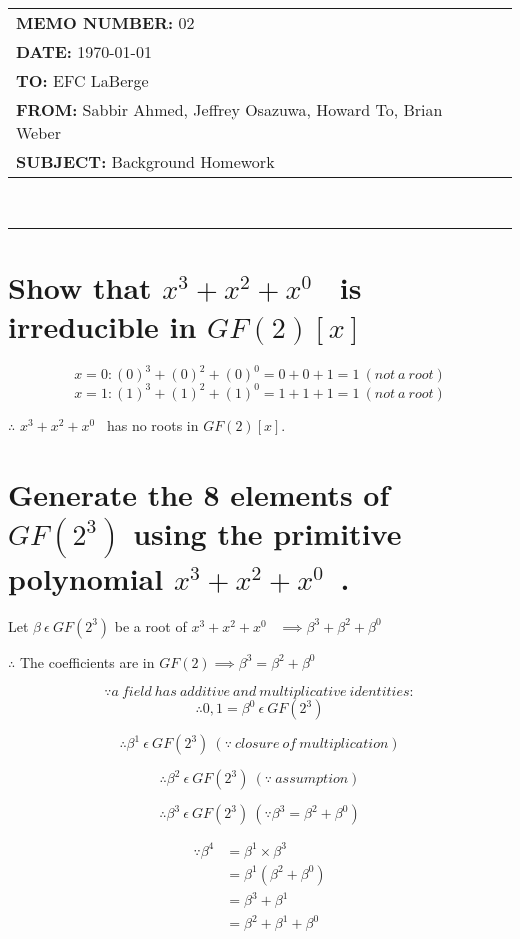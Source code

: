 \documentclass[paper=usletter, fontsize=12pt]{article}
\newcommand{\Sabbir}{Sabbir Ahmed}
\newcommand{\Jeffrey}{Jeffrey Osazuwa}
\newcommand{\Howard}{Howard To}
\newcommand{\Brian}{Brian Weber}
\newcommand{\polynomial}{$x^{3}+x^{2}+x^{0}$}
\newcommand{\documentinfo}[5]{
    \begin{centering}
        \parbox{2in}{
        \begin{spacing}{1}
            \begin{flushleft}
                \begin{tabular}{l l}
                    #1 \\
                    #2 \\
                    #3 \\
                    #4 \\
                    #5 \\
                \end{tabular}\\
                \rule{\textwidth}{1pt}
            \end{flushleft}
        \end{spacing}
        }
    \end{centering}
}
\begin{document}
     \documentinfo{\textbf{MEMO NUMBER:} 02}{\textbf{DATE:} \today}{\textbf{TO: } EFC LaBerge}{\textbf{FROM: }\Sabbir, \Jeffrey, \Howard, \Brian}{\textbf{SUBJECT: } Background Homework}
    \vspace{-0.1in}

    \section{Show that \polynomial~ is irreducible in $GF(2)[x]$}

        \[ x=0: (0)^{3}+(0)^{2}+(0)^{0}=0+0+1=1 \ (not \ a \ root) \]
        \[ x=1: (1)^{3}+(1)^{2}+(1)^{0}=1+1+1=1 \ (not \ a \ root) \]
        \centerline{$\therefore$ \polynomial~ has no roots in $GF(2)[x]$.}

    \section{Generate the 8 elements of $GF(2^{3})$ using the primitive polynomial \polynomial~.}

        \centerline{Let $\beta \ \epsilon \ GF(2^{3})$ be a root of \polynomial~ $\implies \beta^{3}+\beta^{2}+\beta^{0}$}

        \hspace*{\fill}
        \centerline{$\therefore$ The coefficients are in $GF(2) \implies \beta^{3}=\beta^{2}+\beta^{0}$}

        \[ \because a \ field \ has \ additive \ and \ multiplicative \ identities: \]
        \[ \therefore 0, 1=\beta^{0} \ \epsilon \ GF(2^{3}) \]

        \[ \therefore \beta^{1} \ \epsilon \ GF(2^{3}) \ (\because \ closure \ of \ multiplication) \]

        \[ \therefore \beta^{2} \ \epsilon \ GF(2^{3}) \ (\because \ assumption) \]

        \[ \therefore \beta^{3} \ \epsilon \ GF(2^{3}) \ (\because \beta^{3}=\beta^{2}+\beta^{0}) \]

        \begin{equation*}
            \begin{split}
                \because \beta^{4} & = \beta^{1} \times \beta^{3} \\
                & = \beta^{1} (\beta^{2}+\beta^{0}) \\
                & = \beta^{3}+\beta^{1} \\
                & = \beta^{2}+\beta^{1}+\beta^{0}
            \end{split}
        \end{equation*}
\end{document}
